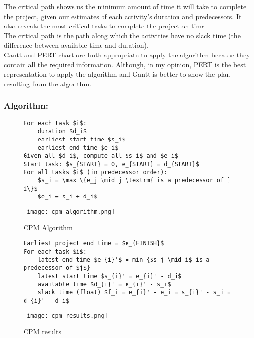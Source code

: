 The critical path shows us the minimum amount of time it will take to complete the project,
given our estimates of each activity’s duration and predecessors. It also reveals the most critical tasks to complete the project on time.\\

The critical path is the path along which the activities have no slack time (the difference between available time and duration).\\

Gantt and PERT chart are both appropriate to apply the algorithm because they contain all the
required information. Although, in my opinion, PERT is the best representation to apply the
algorithm and Gantt is better to show the plan resulting from the algorithm.

\subsubsection{Algorithm:}

\begin{figure}[!ht]
\begin{minipage}[t]{\linewidth}
    \begin{minipage}[c]{0.6\linewidth}
        \begin{lstlisting}[mathescape, frame=single, caption={CPM Algorithm},captionpos=b]
For each task $i$:
    duration $d_i$
    earliest start time $s_i$
    earliest end time $e_i$
Given all $d_i$, compute all $s_i$ and $e_i$
Start task: $s_{START} = 0, e_{START} = d_{START}$
For all tasks $i$ (in predecessor order):
    $s_i = \max \{e_j \mid j \textrm{ is a predecessor of } i\}$
    $e_i = s_i + d_i$
        \end{lstlisting}
    \end{minipage}
    \begin{minipage}[c]{0.35\linewidth}
        \texttt{[image: cpm\_algorithm.png]}
        \caption{CPM Algorithm}
    \end{minipage}
\end{minipage}
    \begin{minipage}{0.8\linewidth}
		\begin{lstlisting}[mathescape, frame=single, caption={CPM results}, captionpos=b]
Earliest project end time = $e_{FINISH}$
For each task $i$:
	latest end time $e_{i}'$ = min {$s_j \mid i$ is a predecessor of $j$}
	latest start time $s_{i}' = e_{i}' - d_i$
	available time $d_{i}' = e_{i}' - s_i$
	slack time (float) $f_i = e_{i}' - e_i = s_{i}' - s_i = d_{i}' - d_i$
		\end{lstlisting}
		\centering
    \texttt{[image: cpm\_results.png]}
    \caption{CPM results}
	\end{minipage}
\end{figure}
\FloatBarrier{}

